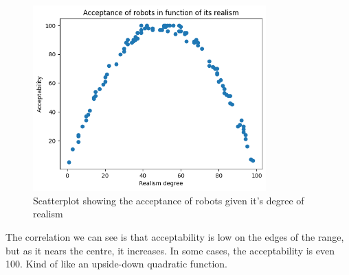 \documentclass[a4paper]{article}
\begin{document}
\begin{figure}[H]
    \centering
    \includegraphics[width=0.8\textwidth]{images/q3scatter.png}
    \caption{Scatterplot showing the acceptance of robots given it's degree of realism}
    \label{fig:q3scatter}
\end{figure}
The correlation we can see is that acceptability is low on the edges of the range, but as it nears the centre, it increases. In some cases, the acceptability is even 100. Kind of like an upside-down quadratic function.
\end{document}
